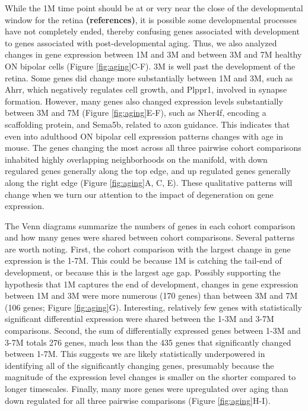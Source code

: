 \documentclass[11pt, a4paper]{article}
\begin{document}
While the 1M time point should be at or very near the close of the developmental window for the retina \textbf{(references)}, it is possible some developmental processes have not completely ended, thereby confusing genes associated with development to genes associated with post-developmental aging. Thus, we also analyzed changes in gene expression between 1M and 3M and between 3M and 7M healthy ON bipolar cells (Figure \ref{fig:aging}C-F). 3M is well past the development of the retina. Some genes did change more substantially between 1M and 3M, such as Ahrr, which negatively regulates cell growth, and Plppr1, involved in synapse formation. However, many genes also changed expression levels substantially between 3M and 7M (Figure \ref{fig:aging}E-F), such as Nher4f, encoding a scaffolding protein,  and Sema5b, related to axon guidance. This indicates that even into adulthood ON bipolar cell expression patterns changes with age in mouse. The genes changing the most across all three pairwise cohort comparisons inhabited highly overlapping neighborhoods on the manifold, with down regulared genes generally along the top edge, and up regulated genes generally along the right edge (Figure \ref{fig:aging}A, C, E). These qualitative patterns will change when we turn our attention to the impact of degeneration on gene expression.

The Venn diagrams summarize the numbers of genes in each cohort comparison and how many genes were shared between cohort comparisons. Several patterns are worth noting. First, the cohort comparison with the largest change in gene expression is the 1-7M. This could be because 1M is catching the tail-end of development, or because this is the largest age gap. Possibly supporting the hypothesis that 1M captures the end of development, changes in gene expression between 1M and 3M were more numerous (170 genes) than between 3M and 7M (106 genes; Figure \ref{fig:aging}G). Interesting, relatively few genes with statistically significant differential expression were shared between the 1-3M and 3-7M comparisons. Second, the sum of differentially expressed genes between 1-3M and 3-7M totals 276 genes, much less than the 435 genes that significantly changed between 1-7M. This suggests we are likely statistically underpowered in identifying all of the significantly changing genes, presumably because the magnitude of the expression level changes is smaller on the shorter compared to longer timescales. Finally, many more genes were upregulated over aging than down regulated for all three pairwise comparisons (Figure \ref{fig:aging}H-I). 
\end{document}
